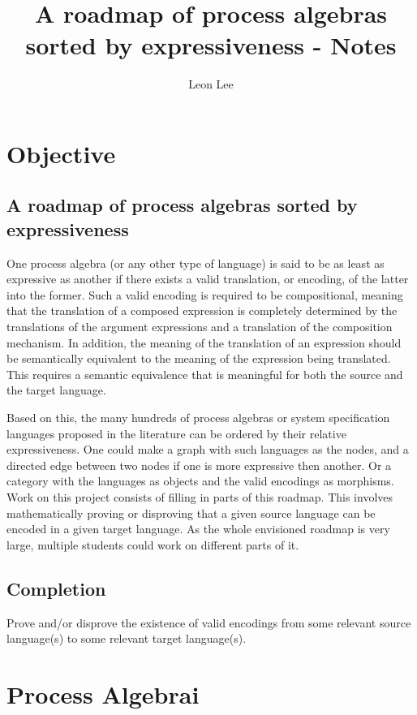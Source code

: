 \documentclass{article}
\title{A roadmap of process algebras sorted by expressiveness - Notes}
\author{Leon Lee}
\begin{document}
\maketitle
\newpage
\tableofcontents
\newpage

\section{Objective}
\subsection{A roadmap of process algebras sorted by expressiveness}

One process algebra (or any other type of language) is said to be as least as expressive as another if there exists a valid translation, or encoding, of the latter into the former. Such a valid encoding is required to be compositional, meaning that the translation of a composed expression is completely determined by the translations of the argument expressions and a translation of the composition mechanism. In addition,  the meaning of the translation of an expression should be semantically equivalent to the meaning of the expression being translated. This requires a semantic equivalence that is meaningful for both the source and the target language.

Based on this, the many hundreds of process algebras or system specification languages proposed in the literature can be ordered by their relative expressiveness. One could make a graph with such languages as the nodes, and a directed edge between two nodes if one is more expressive then another. Or a category with the languages as objects and the valid encodings as morphisms. Work on this project consists of filling in parts of this roadmap. This involves mathematically proving or disproving that a given source language can be encoded in a given target language. As the whole envisioned roadmap is very large, multiple students could work on different parts of it.

\subsection{Completion}
Prove and/or disprove the existence of valid encodings from some relevant source language(s) to some relevant target language(s).

\newpage
\section{Process Algebrai}
\end{document}
